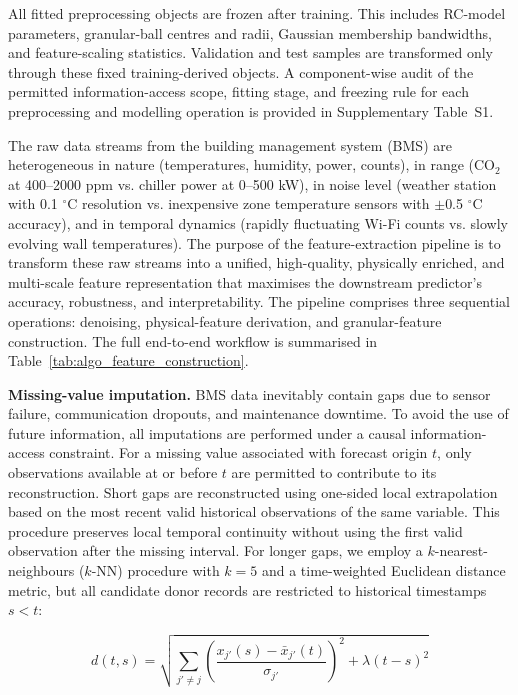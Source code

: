 \documentclass[11pt]{article}
\newcommand{\degree}{\ensuremath{^\circ}}
\begin{document}
All fitted preprocessing objects are frozen after training. This includes RC-model parameters, granular-ball centres and radii, Gaussian membership bandwidths, and feature-scaling statistics. Validation and test samples are transformed only through these fixed training-derived objects. A component-wise audit of the permitted information-access scope, fitting stage, and freezing rule for each preprocessing and modelling operation is provided in Supplementary Table~S1.

The raw data streams from the building management system (BMS) are heterogeneous in nature (temperatures, humidity, power, counts), in range (CO$_2$ at 400--2000 ppm vs. chiller power at 0--500 kW), in noise level (weather station with 0.1 \degree C resolution vs. inexpensive zone temperature sensors with $\pm$0.5 \degree C accuracy), and in temporal dynamics (rapidly fluctuating Wi-Fi counts vs. slowly evolving wall temperatures). The purpose of the feature-extraction pipeline is to transform these raw streams into a unified, high-quality, physically enriched, and multi-scale feature representation that maximises the downstream predictor's accuracy, robustness, and interpretability. The pipeline comprises three sequential operations: denoising, physical-feature derivation, and granular-feature construction. The full end-to-end workflow is summarised in Table~\ref{tab:algo_feature_construction}.

\textbf{Missing-value imputation.} BMS data inevitably contain gaps due to sensor failure, communication dropouts, and maintenance downtime. To avoid the use of future information, all imputations are performed under a causal information-access constraint. For a missing value associated with forecast origin $t$, only observations available at or before $t$ are permitted to contribute to its reconstruction. Short gaps are reconstructed using one-sided local extrapolation based on the most recent valid historical observations of the same variable. This procedure preserves local temporal continuity without using the first valid observation after the missing interval. For longer gaps, we employ a $k$-nearest-neighbours ($k$-NN) procedure with $k=5$ and a time-weighted Euclidean distance metric, but all candidate donor records are restricted to historical timestamps $s<t$:

\begin{equation}
d(t, s) = \sqrt{\sum_{j' \neq j} \left( \frac{x_{j'}(s) - \bar{x}_{j'}(t)}{\sigma_{j'}} \right)^2 + \lambda (t - s)^2}
\end{equation}
\end{document}
